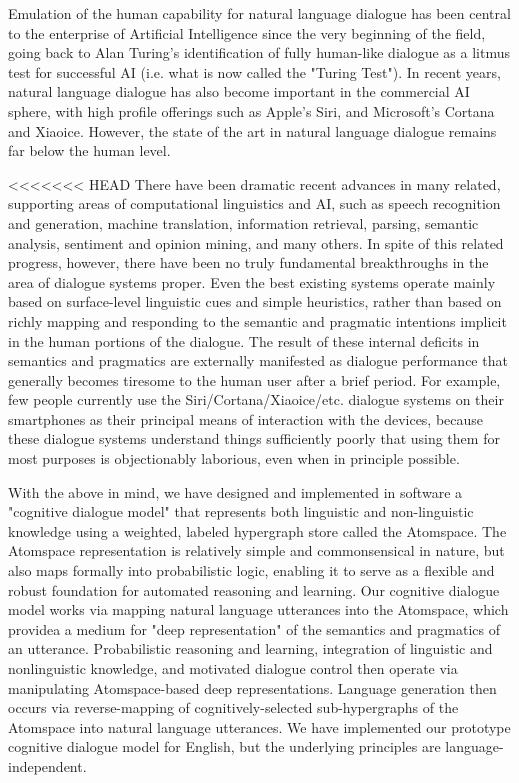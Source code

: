 \begin{englishabstract}

Emulation of the human capability for natural language dialogue has been central to the enterprise of Artificial Intelligence since the very beginning of the field, going back to Alan Turing's identification of fully human-like dialogue as a litmus test for successful AI (i.e. what is now called the "Turing Test").  In recent years, natural language dialogue has also become important in the commercial AI sphere, with high profile offerings such as Apple's Siri, and Microsoft's Cortana and Xiaoice.  However, the state of the art in natural language dialogue remains far below the human level.  

<<<<<<< HEAD
There have been dramatic recent advances in many related, supporting areas of computational linguistics and AI, such as speech recognition and generation, machine translation, information retrieval, parsing, semantic analysis, sentiment and opinion mining, and many others.  In spite of this related progress, however, there have been no truly fundamental breakthroughs in the area of dialogue systems proper.  Even the best existing systems operate mainly based on surface-level linguistic cues and simple heuristics, rather than based on richly mapping and responding to the semantic and pragmatic intentions implicit in the human portions of the dialogue.  The result of these internal deficits in semantics and pragmatics are externally manifested as dialogue performance that generally becomes tiresome to the human user after a brief period.  For example, few people currently use the Siri/Cortana/Xiaoice/etc. dialogue systems on their smartphones as their principal means of interaction with the devices, because these dialogue systems understand things sufficiently poorly that using them for most purposes is objectionably laborious, even when in principle possible.

With the above in mind, we have designed and implemented in software a "cognitive dialogue model" that represents both linguistic and non-linguistic knowledge using a weighted, labeled hypergraph store called the Atomspace.  The Atomspace representation is relatively simple and commonsensical in nature, but also maps formally into probabilistic logic, enabling it to serve as a flexible and robust foundation for automated reasoning and learning.  Our cognitive dialogue  model works via  mapping natural language utterances into the Atomspace, which providea a medium for "deep representation" of the semantics and pragmatics of an utterance.  Probabilistic reasoning and learning, integration of linguistic and nonlinguistic knowledge, and motivated dialogue control then operate via manipulating Atomspace-based deep representations.  Language generation then occurs via reverse-mapping of cognitively-selected sub-hypergraphs of the Atomspace into natural language utterances.  We have implemented our prototype cognitive dialogue model for English, but the underlying principles are language-independent.


\end{englishabstract}
